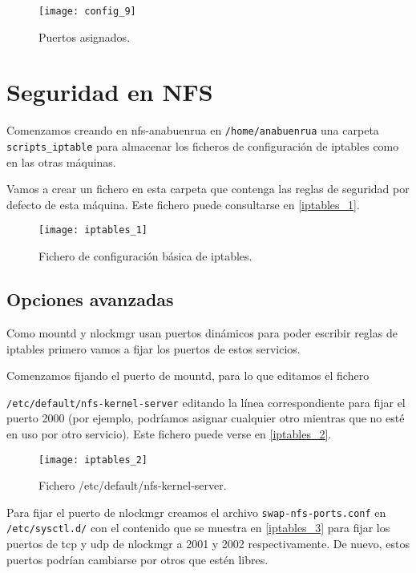 \begin{figure}[h!]
\begin{center}
\caption{Puertos asignados.}
\label{config_10}
\texttt{[image: config\_9]}
\end{center}
\end{figure}

\chapter{Seguridad en NFS}

Comenzamos creando en nfs-anabuenrua en \verb|/home/anabuenrua| una carpeta \verb|scripts_iptable| para almacenar los ficheros de configuración de iptables como en las otras máquinas.

Vamos a crear un fichero en esta carpeta que contenga las reglas de seguridad por defecto de esta máquina. Este fichero puede consultarse en \eqref{iptables_1}.

\begin{figure}[h!]
\begin{center}
\caption{Fichero de configuración básica de iptables.}
\label{iptables_1}
\texttt{[image: iptables\_1]}
\end{center}
\end{figure}

\section{Opciones avanzadas}

Como mountd y nlockmgr usan puertos dinámicos para poder escribir reglas de iptables primero vamos a fijar los puertos de estos servicios.

Comenzamos fijando el puerto de mountd, para lo que editamos el fichero 

\verb|/etc/default/nfs-kernel-server| editando la línea correspondiente para fijar el puerto 2000 (por ejemplo, podríamos asignar cualquier otro mientras que no esté en uso por otro servicio). Este fichero puede verse en \eqref{iptables_2}.

\begin{figure}[h!]
\begin{center}
\caption{Fichero /etc/default/nfs-kernel-server.}
\label{iptables_2}
\texttt{[image: iptables\_2]}
\end{center}
\end{figure}

Para fijar el puerto de nlockmgr creamos el archivo \verb|swap-nfs-ports.conf| en \verb|/etc/sysctl.d/| con el contenido que se muestra en \eqref{iptables_3} para fijar los puertos de tcp y udp de nlockmgr a 2001 y 2002 respectivamente. De nuevo, estos puertos podrían cambiarse por otros que estén libres.

